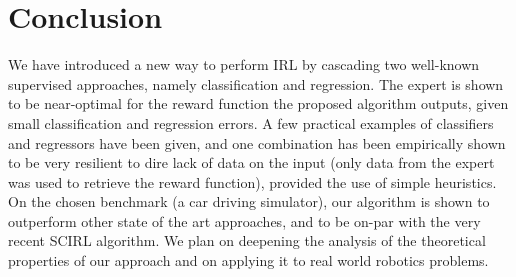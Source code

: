 \documentclass[smallextended]{svjour3}
\begin{document}
\section{Conclusion}
\label{sec:conclusion}
We have introduced a new way to perform IRL by cascading two well-known supervised approaches, namely classification and regression. The expert is shown to be near-optimal for the reward function the proposed algorithm outputs, given small classification and regression errors. A few practical examples of classifiers and regressors have been given, and one combination has been empirically shown to be very resilient to dire lack of data on the input (only data from the expert was used to retrieve the reward function), provided the use of simple heuristics. On the chosen benchmark (a car driving simulator), our algorithm is shown to outperform other state of the art approaches, and to be on-par with the very recent SCIRL algorithm. We plan on deepening the analysis of the theoretical properties of our approach and on applying it to real world robotics problems.
\end{document}
